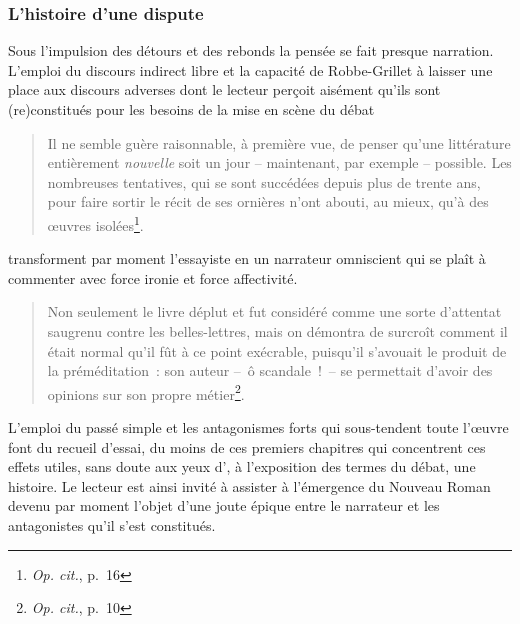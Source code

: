 \subsubsection{L'histoire d'une dispute}
\label{histoireDispute}
Sous l'impulsion des détours et des rebonds la pensée se fait presque narration. L'emploi du discours indirect libre et la capacité de Robbe-Grillet à laisser une place aux discours adverses dont le lecteur perçoit aisément qu'ils sont (re)constitués pour les besoins de la mise en scène du débat~
\begin{quote}
    Il ne semble guère raisonnable, à première vue, de penser qu’une littérature entièrement \textit{nouvelle} soit un jour – maintenant, par exemple – possible. Les nombreuses tentatives, qui se sont succédées depuis plus de trente ans, pour faire sortir le récit de ses ornières n’ont abouti, au mieux, qu’à des œuvres isolées\footnote{\textit{Op. cit.}, p.~16}.
\end{quote}transforment par moment l'essayiste en un narrateur omniscient qui se plaît à commenter avec force ironie et force affectivité.
\begin{quote}
    Non seulement le livre déplut et fut considéré comme une sorte d’attentat saugrenu contre les belles-lettres, mais on démontra de surcroît comment il était normal qu’il fût à ce point exécrable, puisqu’il s’avouait le produit de la préméditation~: son auteur –~ô scandale~!~– se permettait d’avoir des opinions sur son propre métier\footnote{\textit{Op. cit.}, p.~10}.
\end{quote}
L'emploi du passé simple et les antagonismes forts qui sous-tendent toute l'œuvre font du recueil d'essai, du moins de ces premiers chapitres qui concentrent ces effets utiles, sans doute aux yeux d'\robbe{}, à l'exposition des termes du débat, une histoire. Le lecteur est ainsi invité à assister à l'émergence du Nouveau Roman devenu par moment l'objet d'une joute épique entre le narrateur et les antagonistes qu'il s'est constitués.

